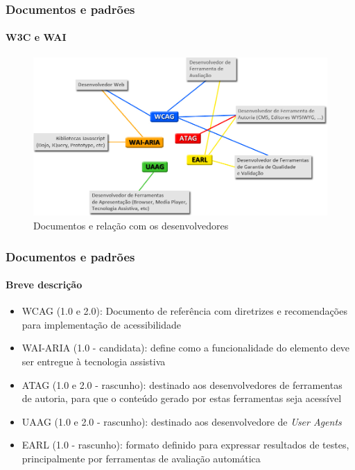 \documentclass{beamer}
\begin{document}
\begin{frame}
\frametitle{Documentos e padrões}
\framesubtitle{W3C e WAI}

\begin{figure}[htbp] \centering
	\includegraphics[width=\textwidth]{./img/relation.jpg}
	\caption{Documentos e relação com os desenvolvedores}
	\label{fig:sub4}
\end{figure}

\end{frame}

\begin{frame}
\frametitle{Documentos e padrões}
\framesubtitle{Breve descrição}

\begin{itemize}
  \item WCAG (1.0 e 2.0): Documento de referência com diretrizes e recomendações para implementação de acessibilidade
  \item WAI-ARIA (1.0 - candidata): define como a funcionalidade do elemento deve ser entregue à tecnologia assistiva
  \item ATAG (1.0 e 2.0 - rascunho): destinado aos desenvolvedores de ferramentas de autoria, para que o conteúdo gerado por estas ferramentas seja acessível
  \item UAAG (1.0 e 2.0 - rascunho): destinado aos desenvolvedore de \textit{User Agents}
  \item EARL (1.0 - rascunho): formato definido para expressar resultados de testes, principalmente por ferramentas de avaliação automática 
\end{itemize}

\end{frame}
\end{document}
